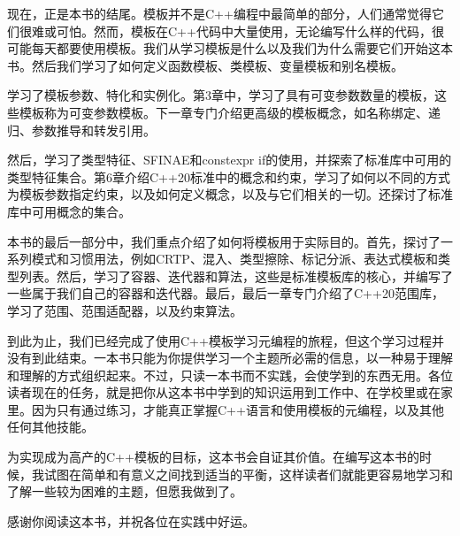 现在，正是本书的结尾。模板并不是C++编程中最简单的部分，人们通常觉得它们很难或可怕。然而，模板在C++代码中大量使用，无论编写什么样的代码，很可能每天都要使用模板。我们从学习模板是什么以及我们为什么需要它们开始这本书。然后我们学习了如何定义函数模板、类模板、变量模板和别名模板。

学习了模板参数、特化和实例化。第3章中，学习了具有可变参数数量的模板，这些模板称为可变参数模板。下一章专门介绍更高级的模板概念，如名称绑定、递归、参数推导和转发引用。

然后，学习了类型特征、SFINAE和constexpr if的使用，并探索了标准库中可用的类型特征集合。第6章介绍C++20标准中的概念和约束，学习了如何以不同的方式为模板参数指定约束，以及如何定义概念，以及与它们相关的一切。还探讨了标准库中可用概念的集合。

本书的最后一部分中，我们重点介绍了如何将模板用于实际目的。首先，探讨了一系列模式和习惯用法，例如CRTP、混入、类型擦除、标记分派、表达式模板和类型列表。然后，学习了容器、迭代器和算法，这些是标准模板库的核心，并编写了一些属于我们自己的容器和迭代器。最后，最后一章专门介绍了C++20范围库，学习了范围、范围适配器，以及约束算法。

到此为止，我们已经完成了使用C++模板学习元编程的旅程，但这个学习过程并没有到此结束。一本书只能为你提供学习一个主题所必需的信息，以一种易于理解和理解的方式组织起来。不过，只读一本书而不实践，会使学到的东西无用。各位读者现在的任务，就是把你从这本书中学到的知识运用到工作中、在学校里或在家里。因为只有通过练习，才能真正掌握C++语言和使用模板的元编程，以及其他任何其他技能。

为实现成为高产的C++模板的目标，这本书会自证其价值。在编写这本书的时候，我试图在简单和有意义之间找到适当的平衡，这样读者们就能更容易地学习和了解一些较为困难的主题，但愿我做到了。

感谢你阅读这本书，并祝各位在实践中好运。


